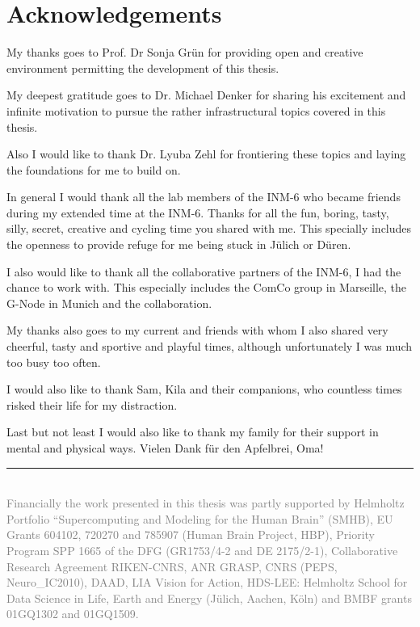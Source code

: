 \cleardoublepage
\pagestyle{plain}
\section*{Acknowledgements}

My thanks goes to Prof. Dr Sonja Grün for providing open and creative environment permitting the development of this thesis.\newline

My deepest gratitude goes to Dr. Michael Denker for sharing his excitement and infinite motivation to pursue the rather infrastructural topics covered in this thesis.\newline

Also I would like to thank Dr. Lyuba Zehl for frontiering these topics and laying the foundations for me to build on.\newline

In general I would thank all the lab members of the INM-6 who became friends during my extended time at the INM-6. Thanks for all the fun, boring, tasty, silly, secret, creative and cycling time you shared with me. This specially includes the openness to provide refuge for me being stuck in Jülich or Düren.\newline

I also would like to thank all the collaborative partners of the INM-6, I had the chance to work with. This especially includes the ComCo group in Marseille, the G-Node in Munich and the  collaboration.\newline

My thanks also goes to my current and friends with whom I also shared very cheerful, tasty and sportive and playful times, although unfortunately I was much too busy too often.\newline

I would also like to thank Sam, Kila and their companions, who countless times risked their life for my distraction.
\newline

Last but not least I would also like to thank my family for their support in mental and physical ways. Vielen Dank für den Apfelbrei, Oma!\newline

\vfill
\textcolor{gray}{\rule{0.3\textwidth}{0.4pt}\\
\smaller
Financially the work presented in this thesis was partly supported by Helmholtz Portfolio “Supercomputing and Modeling for the Human Brain” (SMHB), EU Grants 604102, 720270 and 785907 (Human Brain Project, HBP), Priority Program SPP 1665 of the DFG (GR1753/4-2 and DE 2175/2-1), Collaborative Research Agreement RIKEN-CNRS, ANR GRASP, CNRS (PEPS, Neuro\_IC2010), DAAD, LIA Vision for Action, HDS-LEE: Helmholtz School for Data Science in Life, Earth and Energy (Jülich, Aachen, Köln) and BMBF grants 01GQ1302 and 01GQ1509.}
